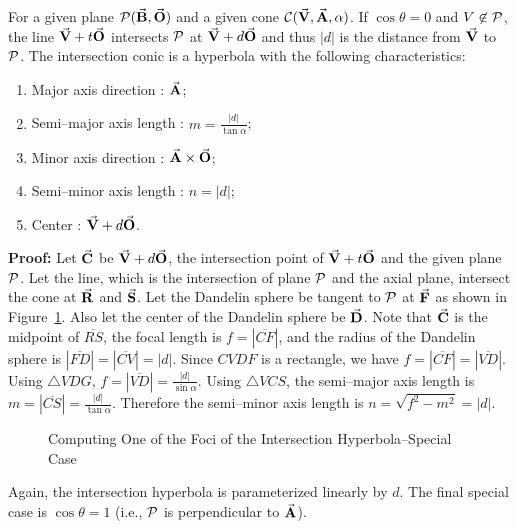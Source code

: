 \begin{theorem}
\label{theorem:cone-hy-special}
     For a given plane ${\cal P}(\vec{\bf B},\vec{\bf O})$ and a given cone
${\cal C}(\vec{\bf V},\vec{\bf A},\alpha)$.  If $\cos\theta= 0$ and 
$V\not\in{\cal P}$, the line $\vec{\bf V}+t\vec{\bf O}$ intersects ${\cal P}$ at
$\vec{\bf V}+d\vec{\bf O}$ and thus $|d|$ is the distance from $\vec{\bf V}$ to
${\cal P}$.  The intersection conic
is a hyperbola with the following characteristics:
\begin{enumerate}
     \item Major axis direction : $\vec{\bf A}$;
     \item Semi--major axis length : $m=\frac{|d|}{\tan\alpha}$;
     \item Minor axis direction : $\vec{\bf A}\times\vec{\bf O}$;
     \item Semi--minor axis length : $n=|d|$;
     \item Center               : $\vec{\bf V}+d\vec{\bf O}$.
\end{enumerate}
\end{theorem}
{\bf Proof:} Let $\vec{\bf C}$ be $\vec{\bf V}+d\vec{\bf O}$, the intersection
point of $\vec{\bf V}+t\vec{\bf O}$ and the given plane ${\cal P}$.
     Let the line, which is the intersection of plane ${\cal P}$ and the 
axial plane,
intersect the 
cone at $\vec{\bf R}$ and $\vec{\bf S}$.  
Let the Dandelin sphere be tangent to ${\cal P}$ at 
$\vec{\bf F}$ as shown in Figure~\ref{fig:hy-special}.  Also let the center of
the Dandelin sphere be $\vec{\bf D}$.  
Note that $\vec{\bf C}$ is the midpoint of $\overline{RS}$, the focal length is
$f=|\overline{CF}|$, and the radius of the Dandelin sphere is
$|\overline{FD}|=|\overline{CV}|=|d|$.  Since $CVDF$ is a rectangle, we have
$f=|\overline{CF}|=|\overline{VD}|$.  Using $\bigtriangleup VDG$,
$f=|\overline{VD}|=\frac{|d|}{\sin\alpha}$.  Using $\bigtriangleup VCS$,
the semi--major axis length is $m=|\overline{CS}|=\frac{|d|}{\tan\alpha}$.
Therefore the semi--minor axis length is $n=\sqrt{f^2-m^2}=|d|$.
\QED

\begin{figure}
\vspace{5.5cm}
\caption{Computing One of the Foci of the Intersection Hyperbola--Special Case}
\label{fig:hy-special}
\end{figure}

     Again, the intersection hyperbola is parameterized linearly by $d$.
The final special case is $\cos\theta=1$ (i.e., ${\cal P}$ is
perpendicular to $\vec{\bf A}$).

